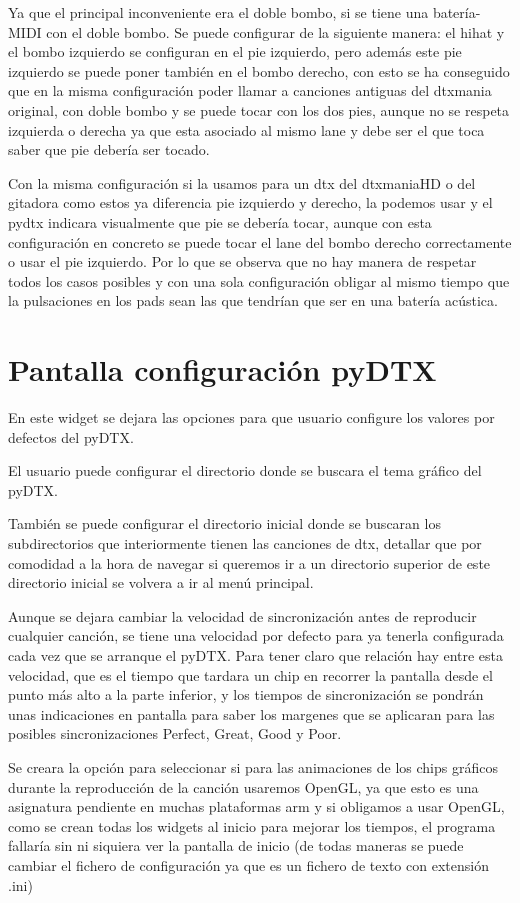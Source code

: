 \documentclass[a4paper,11pt,oneside]{book}
\begin{document}
Ya que el principal inconveniente era el doble bombo, si se tiene una batería-MIDI con el doble bombo. 
Se puede configurar de la siguiente manera: el hihat y el bombo izquierdo se configuran en el pie izquierdo, pero además este pie izquierdo se puede poner también en el bombo derecho, con esto se ha conseguido que en la misma configuración poder llamar a canciones antiguas del dtxmania original, con doble bombo y se puede tocar con los dos pies, aunque no se respeta izquierda o derecha ya que esta asociado al mismo lane y debe ser el que toca saber que pie debería ser tocado. 

Con la misma configuración si la usamos para un dtx del dtxmaniaHD o del gitadora como estos ya diferencia pie izquierdo y derecho, la podemos usar y el pydtx indicara visualmente que pie se debería tocar, aunque con esta configuración en concreto se puede tocar el lane del bombo derecho correctamente o usar el pie izquierdo. Por lo que se observa que no hay manera de respetar todos los casos posibles y con una sola configuración obligar al mismo tiempo que la pulsaciones en los pads sean las que tendrían que ser en una batería acústica.

\section{Pantalla configuración pyDTX}
En este widget se dejara las opciones para que usuario configure los valores por defectos del pyDTX.

El usuario puede configurar el directorio donde se buscara el tema gráfico del pyDTX.

También se puede configurar el directorio inicial donde se buscaran los subdirectorios que interiormente tienen las canciones de dtx, detallar que por comodidad a la hora de navegar si queremos ir a un directorio superior de este directorio inicial se volvera a ir al menú principal.

Aunque se dejara cambiar la velocidad de sincronización antes de reproducir cualquier canción, se tiene una velocidad por defecto para ya tenerla configurada cada vez que se arranque el pyDTX.
Para tener claro que relación hay entre esta velocidad, que es el tiempo que tardara un chip en recorrer la pantalla desde el punto más alto a la parte inferior, y los tiempos de sincronización se pondrán unas indicaciones en pantalla para saber los margenes que se aplicaran para las posibles sincronizaciones Perfect, Great, Good y Poor.

Se creara la opción para seleccionar si para las animaciones de los chips gráficos durante la reproducción de la canción usaremos OpenGL, ya que esto es una asignatura pendiente en muchas plataformas arm y si obligamos a usar OpenGL, como se crean todas los widgets al inicio para mejorar los tiempos, el programa fallaría sin ni siquiera ver la pantalla de inicio (de todas maneras se puede cambiar el fichero de configuración ya que es un fichero de texto con extensión .ini)
 
\end{document}
